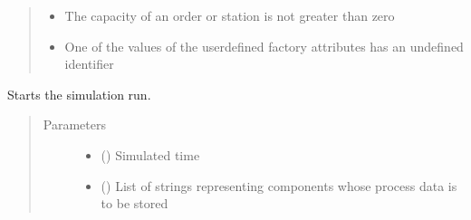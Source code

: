 \documentclass[letterpaper,10pt,english]{sphinxmanual}
\begin{document}
\begin{fulllineitems}
\begin{fulllineitems}
\begin{quote}
\begin{description}
\begin{itemize}
\item {} 
\sphinxAtStartPar
{} \textendash{} The capacity of an order or station is not greater than zero

\item {} 
\sphinxAtStartPar
{} \textendash{} One of the values of the user\sphinxhyphen{}defined factory attributes has an undefined
identifier

\end{itemize}

\end{description}\end{quote}

\end{fulllineitems}


\begin{fulllineitems}
\label{\detokenize{source/API/api:environment.Environment.simulate}}
\sphinxAtStartPar
Starts the simulation run.
\begin{quote}\begin{description}
\item[{Parameters}] \leavevmode\begin{itemize}
\item {} 
\sphinxAtStartPar
{} () \textendash{} Simulated time

\item {} 
\sphinxAtStartPar
{} (\sphinxstyleliteralemphasis{\sphinxupquote{{[}}}\sphinxstyleliteralemphasis{\sphinxupquote{{]}}}\sphinxstyleliteralemphasis{\sphinxupquote{, }}) \textendash{} List of strings representing components whose process data is to be stored


\end{itemize}
\end{description}
\end{quote}
\end{fulllineitems}
\end{fulllineitems}
\end{document}
